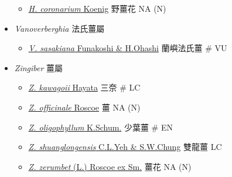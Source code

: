 \begin{itemize}
  \begin{itemize}
        \item[] \href{http://www.theplantlist.org/tpl1.1/search?q=Hedychium+coronarium}{\textit{H. coronarium} Koenig}   野薑花   NA (N)
  \end{itemize}
 \item[] \textit{Vanoverberghia} 法氏薑屬
                                
  \begin{itemize}
        \item[] \href{http://www.theplantlist.org/tpl1.1/search?q=Vanoverberghia+sasakiana}{\textit{V. sasakiana} Funakoshi \& H.Ohashi}   蘭嶼法氏薑  \# VU
  \end{itemize}
 \item[] \textit{Zingiber} 薑屬
                                
  \begin{itemize}
        \item[] \href{http://www.theplantlist.org/tpl1.1/search?q=Zingiber+kawagoii}{\textit{Z. kawagoii} Hayata}   三奈  \# LC
        \item[] \href{http://www.theplantlist.org/tpl1.1/search?q=Zingiber+officinale}{\textit{Z. officinale} Roscoe}   薑   NA (N)
        \item[] \href{http://www.theplantlist.org/tpl1.1/search?q=Zingiber+oligophyllum}{\textit{Z. oligophyllum} K.Schum.}   少葉薑  \# EN
        \item[] \href{http://www.theplantlist.org/tpl1.1/search?q=Zingiber+shuanglongensis}{\textit{Z. shuanglongensis} C.L.Yeh \& S.W.Chung}   雙龍薑   LC
        \item[] \href{http://www.theplantlist.org/tpl1.1/search?q=Zingiber+zerumbet}{\textit{Z. zerumbet} (L.) Roscoe ex Sm.}   薑花   NA (N)
  \end{itemize}
  \end{itemize}
